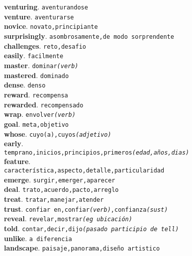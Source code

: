 \documentclass[twocolumn]{article}
\begin{document}
	\textsf{\textbf{venturing}}. \texttt{aventurandose}\\
	\textsf{\textbf{venture}}. \texttt{aventurarse}\\
	\textsf{\textbf{novice}}. \texttt{novato,principiante}\\
	\textsf{\textbf{surprisingly}}. \texttt{asombrosamente,de modo sorprendente}\\
	\textsf{\textbf{challenges}}. \texttt{reto,desafio}\\
	\textsf{\textbf{easily}}. \texttt{facilmente}\\
	\textsf{\textbf{master}}. \texttt{dominar{\scriptsize \textsl{(verb)}}}\\
	\textsf{\textbf{mastered}}. \texttt{dominado}\\
	\textsf{\textbf{dense}}. \texttt{denso}\\
	\textsf{\textbf{reward}}. \texttt{recompensa}\\
	\textsf{\textbf{rewarded}}. \texttt{recompensado}\\
	\textsf{\textbf{wrap}}. \texttt{envolver{\scriptsize \textsl{(verb)}}}\\
	\textsf{\textbf{goal}}. \texttt{meta,objetivo}\\
	\textsf{\textbf{whose}}. \texttt{cuyo(a),cuyos{\scriptsize \textsl{(adjetivo)}}}\\
	\textsf{\textbf{early}}.\\\texttt{temprano,inicios,principios,primeros{\scriptsize \textsl{(edad,a\~nos,dias)}}}\\
	\textsf{\textbf{feature}}.\\\texttt{caracter\'istica,aspecto,detalle,particularidad}\\
	\textsf{\textbf{emerge}}. \texttt{surgir,emerger,aparecer}\\
	\textsf{\textbf{deal}}. \texttt{trato,acuerdo,pacto,arreglo}\\
	\textsf{\textbf{treat}}. \texttt{tratar,manejar,atender}\\
	\textsf{\textbf{trust}}. \texttt{confiar en,confiar{\scriptsize \textsl{(verb)}},confianza{\scriptsize \textsl{(sust)}}}\\
	\textsf{\textbf{reveal}}. \texttt{revelar,mostrar{\scriptsize \textsl{(eg ubicaci\'on)}}}\\
	\textsf{\textbf{told}}. \texttt{contar,decir,dijo{\scriptsize \textsl{(pasado participio de tell)}}}\\
	\textsf{\textbf{unlike}}. \texttt{a diferencia}\\
	\textsf{\textbf{landscape}}. \texttt{paisaje,panorama,dise\~no artistico}\\
\end{document}
